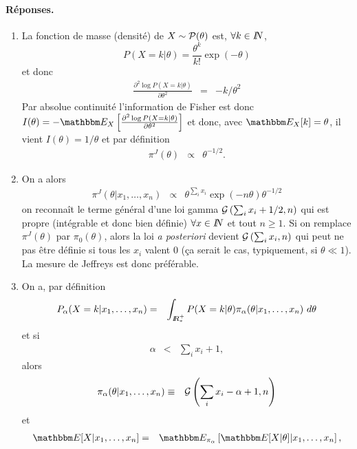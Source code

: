\paragraph{\bf Réponses.}
\begin{enumerate}
\item La fonction de masse (densité) de $X\sim {\cal{P}}(\theta)$ est, $\forall k\in I\!\!N$, 
$$
P(X=k|\theta) = \frac{\theta^k}{k!}\exp(-\theta) 
$$
et donc
\begin{eqnarray*}
\frac{\partial^2 \log P(X=k|\theta)}{\partial \theta^2} &= & -k/\theta^2
\end{eqnarray*}
Par absolue continuité l'information de Fisher est donc $I(\theta)=-\E_X\left[\frac{\partial^2 \log P(X=k|\theta)}{\partial \theta^2}\right]$ et donc, avec $\E_X[k]=\theta$, il vient  $I(\theta)=1/\theta$ et par définition
\begin{eqnarray*}
\pi^J(\theta) & \propto & \theta^{-1/2}.
\end{eqnarray*}
\item On a alors
\begin{eqnarray*}
\pi^J(\theta|x_1,\ldots,x_n) & \propto & \theta^{\sum_i x_i} \exp\left(-n\theta\right) \theta^{-1/2}
\end{eqnarray*}
on reconnaît le terme général d'une loi gamma ${\cal{G}}\left(\sum_i x_i+1/2,n\right)$ qui est propre (intégrable et donc bien définie) $\forall x\in I\!\!N$ et tout $n\geq 1$. Si on remplace $\pi^J(\theta)$ par $\pi_0(\theta)$, alors la loi {\it a posteriori} devient ${\cal{G}}\left(\sum_i x_i,n\right)$ qui peut ne pas être définie si tous les $x_i$ valent 0 (\c ca serait le cas, typiquement, si $\theta\ll 1$). La mesure de Jeffreys est donc préférable.
\item On a, par définition
\begin{eqnarray}
P_{\alpha}(X=k|x_1,\ldots,x_n) & = & \int_{I\!\!R^+_*} P(X=k|\theta)\pi_{\alpha}(\theta|x_1,\ldots,x_n)\ d\theta \label{eq1}
\end{eqnarray}
et si 
\begin{eqnarray}
\alpha & < & \sum_i x_i+1, \label{cond1}
\end{eqnarray}
alors
\begin{eqnarray}
\pi_{\alpha}(\theta|x_1,\ldots,x_n) & \equiv & {\cal{G}}\left(\sum_i x_i-\alpha+1,n\right) \label{eq2}
\end{eqnarray}
et 
\begin{eqnarray*}
\E[X|x_1,\ldots,x_n] &= & \E_{\pi_{\alpha}}\left[\E[X|\theta] | x_1,\ldots,x_n\right], \\

\end{eqnarray*}
\end{enumerate}
